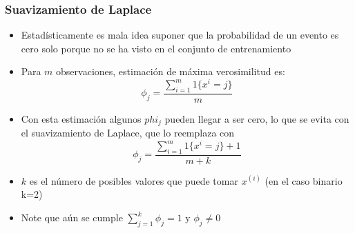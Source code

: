 \documentclass{beamer}
\begin{document}
\begin{frame}
\frametitle{Suavizamiento de Laplace}
\begin{itemize}
\item Estadísticamente es mala idea suponer que la probabilidad de un evento es cero solo porque no se ha visto en el conjunto de entrenamiento
\item Para $m$ observaciones, estimación de máxima verosimilitud es: 
\begin{equation*}
\phi_j=\frac{\sum_{i=1}^m 1 \lbrace x^{i}=j \rbrace}{m}
\end{equation*}

\item Con esta estimación algunos $phi_j$ pueden llegar a ser cero, lo que se evita con el suavizamiento de Laplace, que lo reemplaza con 
\begin{equation*}
\phi_j=\frac{\sum_{i=1}^m 1 \lbrace x^{i}=j \rbrace+1}{m+k}
\end{equation*}

\item $k$ es el número de posibles valores que puede tomar $x^{(i)}$ (en el caso binario k=2)
\item Note que aún se cumple $\sum_{j=1}^k \phi_j=1$ y $\phi_j\neq 0$
\end{itemize}



\end{frame}

\end{document}

